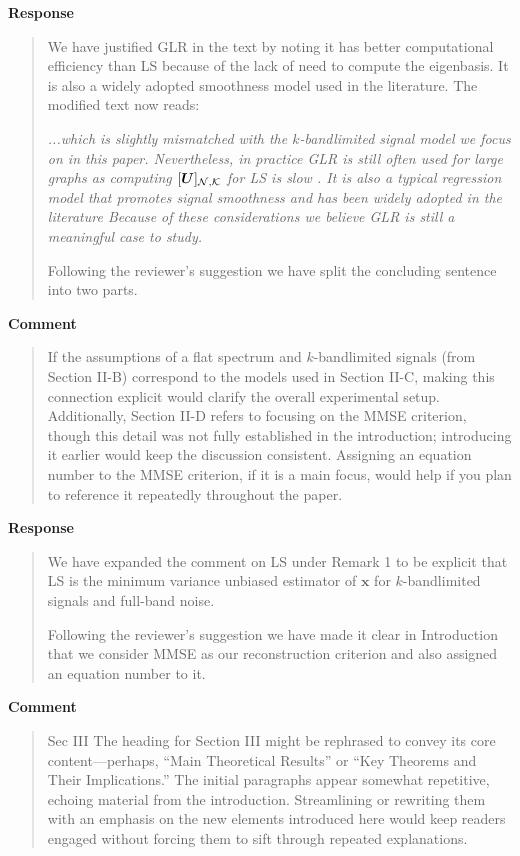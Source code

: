 \documentclass[11pt,onecolumn,journal]{IEEEtran}
\newcommand{\vect}[1]{\bm{#1}}
\theoremstyle{definition}
\newcommand{\matrsubU}[1]{\matrsub[#1, K]{U}}
\begin{document}
\textbf{Response}
\begin{quote}

We have justified GLR in the text by noting it has better computational efficiency than LS because of the lack of need to compute the eigenbasis. It is also a widely adopted smoothness model used in the literature. The modified text now reads:

{\it ...which is slightly mismatched with the $k$-bandlimited signal model we focus on in this paper. Nevertheless, in practice GLR is still often used for large graphs as computing $\matrsubU{N}$ for LS is slow \cite{puy2018random, bai2020fast}. It is also a typical regression model that promotes signal smoothness and
has been widely adopted in the literature \cite{belkin2004semi} Because of these considerations we believe GLR is still a meaningful case to study.}


Following the reviewer's suggestion we have split the concluding sentence into two parts. 
\end{quote}

\textbf{Comment}
\begin{quote}
If the assumptions of a flat spectrum and $k$-bandlimited signals (from Section II-B) correspond to the models used in Section II-C, making this connection explicit would clarify the overall experimental setup. Additionally, Section II-D refers to focusing on the MMSE criterion, though this detail was not fully established in the introduction; introducing it earlier would keep the discussion consistent. Assigning an equation number to the MMSE criterion, if it is a main focus, would help if you plan to reference it repeatedly throughout the paper.
\end{quote}

\textbf{Response}
\begin{quote}
We have expanded the comment on LS under Remark 1 to be explicit that LS is the minimum variance unbiased estimator of $\vect{x}$ for $k$-bandlimited signals and full-band noise.

Following the reviewer's suggestion we have made it clear in Introduction that we consider MMSE as our reconstruction criterion and also assigned an equation number to it.
\end{quote}

\textbf{Comment}
\begin{quote}
Sec III
The heading for Section III might be rephrased to convey its core content—perhaps, “Main Theoretical Results” or “Key Theorems and Their Implications.” The initial paragraphs appear somewhat repetitive, echoing material from the introduction. Streamlining or rewriting them with an emphasis on the new elements introduced here would keep readers engaged without forcing them to sift through repeated explanations.
\end{quote}
\end{document}
